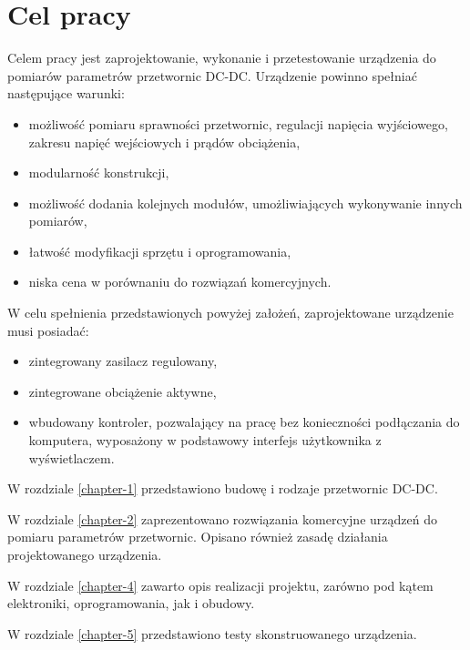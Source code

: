 \chapter{Cel pracy}
\label{chapter0}

Celem pracy jest zaprojektowanie, wykonanie i przetestowanie urządzenia do pomiarów parametrów przetwornic DC-DC. 
Urządzenie powinno spełniać następujące warunki:

\begin{itemize}
    \item możliwość pomiaru sprawności przetwornic, regulacji napięcia wyjściowego, zakresu napięć wejściowych i prądów obciążenia,
    \item modularność konstrukcji,
    \item możliwość dodania kolejnych modułów, umożliwiających wykonywanie innych pomiarów,
    \item łatwość modyfikacji sprzętu i oprogramowania,
    \item niska cena w porównaniu do rozwiązań komercyjnych.
\end{itemize}

W celu spełnienia przedstawionych powyżej założeń, zaprojektowane urządzenie musi posiadać:
\begin{itemize}
    \item zintegrowany zasilacz regulowany,
    \item zintegrowane obciążenie aktywne,
    \item wbudowany kontroler, pozwalający na pracę bez konieczności podłączania do komputera, wyposażony w podstawowy interfejs użytkownika z wyświetlaczem.
\end{itemize}


W rozdziale \ref{chapter-1} przedstawiono budowę i rodzaje przetwornic DC-DC.

W rozdziale \ref{chapter-2} zaprezentowano rozwiązania komercyjne urządzeń do pomiaru parametrów przetwornic. Opisano 
również zasadę działania projektowanego urządzenia.

W rozdziale \ref{chapter-4} zawarto opis realizacji projektu, zarówno pod kątem elektroniki, oprogramowania, jak i obudowy.

W rozdziale \ref{chapter-5} przedstawiono testy skonstruowanego urządzenia.

